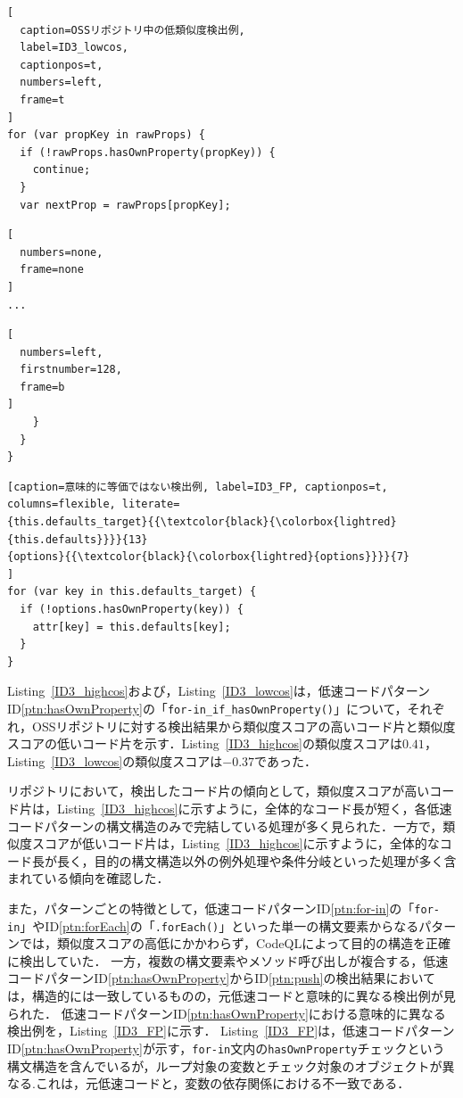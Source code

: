 \documentclass[11pt]{jreport}
\begin{document}
\begin{lstlisting}[
  caption=OSSリポジトリ中の低類似度検出例,
  label=ID3_lowcos,
  captionpos=t,
  numbers=left,
  frame=t
]
for (var propKey in rawProps) {
  if (!rawProps.hasOwnProperty(propKey)) {
    continue;
  }
  var nextProp = rawProps[propKey];
\end{lstlisting}
\begin{lstlisting}[
  numbers=none,
  frame=none
]
...
\end{lstlisting}
\begin{lstlisting}[
  numbers=left,
  firstnumber=128,
  frame=b
]
    }
  }
}
\end{lstlisting} 
\begin{lstlisting}[caption=意味的に等価ではない検出例, label=ID3_FP, captionpos=t, columns=flexible, literate=
{this.defaults_target}{{\textcolor{black}{\colorbox{lightred}{this.defaults}}}}{13}
{options}{{\textcolor{black}{\colorbox{lightred}{options}}}}{7}
]
for (var key in this.defaults_target) {
  if (!options.hasOwnProperty(key)) {
    attr[key] = this.defaults[key];
  }
}
\end{lstlisting}

Listing~\ref{ID3_highcos}および，Listing~\ref{ID3_lowcos}は，低速コードパターンID\ref{ptn:hasOwnProperty}の「\texttt{for-in\_if\_hasOwnProperty()}」について，それぞれ，OSSリポジトリに対する検出結果から類似度スコアの高いコード片と類似度スコアの低いコード片を示す．Listing~\ref{ID3_highcos}の類似度スコアは$0.41$，Listing~\ref{ID3_lowcos}の類似度スコアは$-0.37$であった．

リポジトリにおいて，検出したコード片の傾向として，類似度スコアが高いコード片は，Listing~\ref{ID3_highcos}に示すように，全体的なコード長が短く，各低速コードパターンの構文構造のみで完結している処理が多く見られた．一方で，類似度スコアが低いコード片は，Listing~\ref{ID3_highcos}に示すように，全体的なコード長が長く，目的の構文構造以外の例外処理や条件分岐といった処理が多く含まれている傾向を確認した．

また，パターンごとの特徴として，低速コードパターンID\ref{ptn:for-in}の「\texttt{for-in}」やID\ref{ptn:forEach}の「\texttt{.forEach()}」といった単一の構文要素からなるパターンでは，類似度スコアの高低にかかわらず，CodeQLによって目的の構造を正確に検出していた．
一方，複数の構文要素やメソッド呼び出しが複合する，低速コードパターンID\ref{ptn:hasOwnProperty}からID\ref{ptn:push}の検出結果においては，構造的には一致しているものの，元低速コードと意味的に異なる検出例が見られた．
低速コードパターンID\ref{ptn:hasOwnProperty}における意味的に異なる検出例を，Listing~\ref{ID3_FP}に示す．
Listing~\ref{ID3_FP}は，低速コードパターンID\ref{ptn:hasOwnProperty}が示す，\texttt{for-in}文内の\texttt{hasOwnProperty}チェックという構文構造を含んでいるが，ループ対象の変数とチェック対象のオブジェクトが異なる.これは，元低速コードと，変数の依存関係における不一致である．
\end{document}

